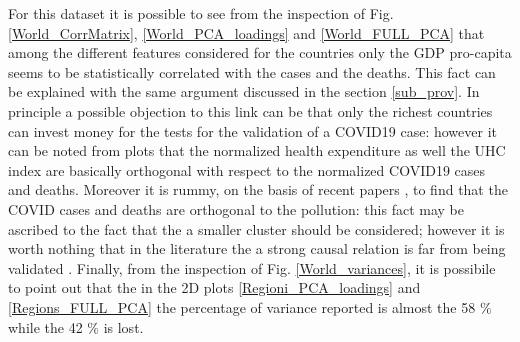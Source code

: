\documentclass[
12pt, %
a4paper, %
oneside, %
headinclude,footinclude, %
BCOR5mm, %
]{scrartcl}
\begin{document}
For this dataset it is possible to see from the inspection of Fig. \ref{World_CorrMatrix}, \ref{World_PCA_loadings} and \ref{World_FULL_PCA} that among the different features considered for the countries only the GDP pro-capita seems to be statistically correlated with the cases and the deaths. This fact can be explained with the same argument discussed in the section \ref{sub_prov}. In principle a possible objection to this link can be that only the richest countries can invest money for the tests for the validation of a COVID19 case: however it can be noted from plots that the normalized health expenditure as well the UHC index are basically orthogonal with respect to the normalized COVID19 cases and deaths. Moreover it is rummy, on the basis of recent papers , to find that the COVID cases and deaths are orthogonal to the pollution: this fact may be ascribed to the fact that the a smaller cluster should be considered; however it is worth nothing that in the literature the a strong causal relation is far from being validated \cite{contini2020does}. Finally, from the inspection of Fig. \ref{World_variances}, it is possibile to point out that the in the 2D plots \ref{Regioni_PCA_loadings} and \ref{Regions_FULL_PCA} the percentage of variance reported is almost the 58 $ \% $ while the 42 $ \% $ is lost.
\end{document}
